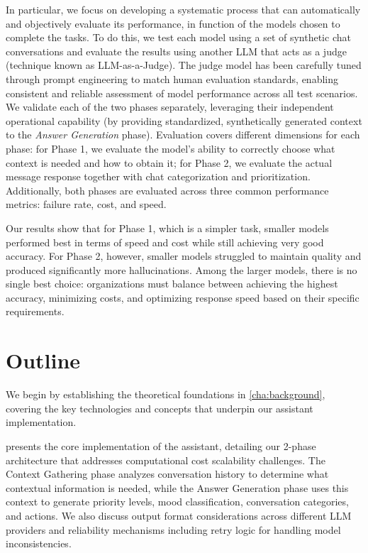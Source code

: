 
In particular, we focus on developing a systematic process that can automatically and objectively evaluate its performance, in function of the models chosen to complete the tasks.
To do this, we test each model using a set of synthetic chat conversations and evaluate the results using another LLM that acts as a judge (technique known as LLM-as-a-Judge).
The judge model has been carefully tuned through prompt engineering to match human evaluation standards, enabling consistent and reliable assessment of model performance across all test scenarios.
We validate each of the two phases separately, leveraging their independent operational capability (by providing standardized, synthetically generated context to the \textit{Answer Generation} phase).
Evaluation covers different dimensions for each phase: for Phase 1, we evaluate the model's ability to correctly choose what context is needed and how to obtain it; for Phase 2, we evaluate the actual message response together with chat categorization and prioritization.
Additionally, both phases are evaluated across three common performance metrics: failure rate, cost, and speed.

Our results show that for Phase 1, which is a simpler task, smaller models performed best in terms of speed and cost while still achieving very good accuracy.
For Phase 2, however, smaller models struggled to maintain quality and produced significantly more hallucinations.
Among the larger models, there is no single best choice: organizations must balance between achieving the highest accuracy, minimizing costs, and optimizing response speed based on their specific requirements.

\section{Outline}


We begin by establishing the theoretical foundations in \cref{cha:background}, covering the key technologies and concepts that underpin our assistant implementation.

 presents the core implementation of the assistant, detailing our 2-phase architecture that addresses computational cost scalability challenges.
The Context Gathering phase analyzes conversation history to determine what contextual information is needed, while the Answer Generation phase uses this context to generate priority levels, mood classification, conversation categories, and actions.
We also discuss output format considerations across different LLM providers and reliability mechanisms including retry logic for handling model inconsistencies.

